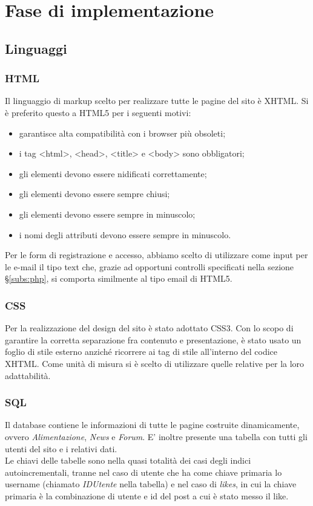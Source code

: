 \section{Fase di implementazione}
\subsection{Linguaggi}
\subsubsection{HTML}
Il linguaggio di markup scelto per realizzare tutte le pagine del sito è XHTML. Si è preferito questo a HTML5 per i seguenti motivi:
\begin{itemize}
    \item garantisce alta compatibilità con i browser più obsoleti;
    \item i tag <html>, <head>, <title> e <body> sono obbligatori;
	\item gli elementi devono essere nidificati correttamente;
	\item gli elementi devono essere sempre chiusi;
	\item gli elementi devono essere sempre in minuscolo;
	\item i nomi degli attributi devono essere sempre in minuscolo.
\end{itemize}

Per le form di registrazione e accesso, abbiamo scelto di utilizzare come input per le e-mail il tipo text che, grazie ad opportuni controlli specificati nella sezione \S\ref{subs:php}, 
si comporta similmente al tipo email di HTML5.

\subsubsection{CSS}
Per la realizzazione del design del sito è stato adottato CSS3. 
Con lo scopo di garantire la corretta separazione fra contenuto e presentazione, è stato usato un foglio di stile esterno anziché ricorrere ai tag di stile all'interno del codice XHTML. 
Come unità di misura si è scelto di utilizzare quelle relative per la loro adattabilità.
\subsubsection{SQL}

Il database contiene le informazioni di tutte le pagine costruite dinamicamente, ovvero \textit{Alimentazione}, \textit{News} e \textit{Forum}. E' inoltre presente una tabella con tutti gli utenti del sito e i relativi dati.\\
Le chiavi delle tabelle sono nella quasi totalità dei casi degli indici autoincrementali, tranne nel caso di utente che ha come chiave primaria lo username (chiamato \textit{IDUtente} nella tabella) e nel caso di \textit{likes}, in cui la chiave primaria è la combinazione di utente e id del post a cui è stato messo il like.

